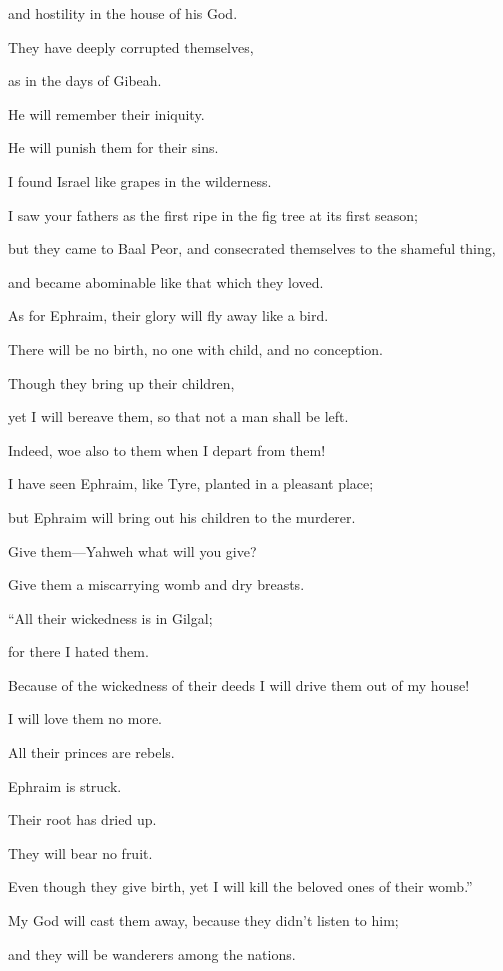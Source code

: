 {\par }{\QB and hostility in the house of his God.
\par }{\Q {}They have deeply corrupted themselves,
\par }{\QB as in the days of Gibeah.
\par }{\QB He will remember their iniquity.
\par }{\QB He will punish them for their sins.
\par }{\Q {}I found Israel like grapes in the wilderness.
\par }{\QB I saw your fathers as the first ripe in the fig tree at its first season;
\par }{\QB but they came to Baal Peor, and consecrated themselves to the shameful thing,
\par }{\QB and became abominable like that which they loved.
\par }{\Q {}As for Ephraim, their glory will fly away like a bird.
\par }{\QB There will be no birth, no one with child, and no conception.
\par }{\Q {}Though they bring up their children,
\par }{\QB yet I will bereave them, so that not a man shall be left.
\par }{\QB Indeed, woe also to them when I depart from them!
\par }{\Q {}I have seen Ephraim, like Tyre, planted in a pleasant place;
\par }{\QB but Ephraim will bring out his children to the murderer.
\par }{\Q {}Give them—Yahweh what will you give?
\par }{\QB Give them a miscarrying womb and dry breasts.
\par }{\BB \par }{\Q {}“All their wickedness is in Gilgal;
\par }{\QB for there I hated them.
\par }{\QB Because of the wickedness of their deeds I will drive them out of my house!
\par }{\QB I will love them no more.
\par }{\QB All their princes are rebels.
\par }{\Q {}Ephraim is struck.
\par }{\QB Their root has dried up.
\par }{\QB They will bear no fruit.
\par }{\QB Even though they give birth, yet I will kill the beloved ones of their womb.”
\par }{\BB \par }{\Q {}My God will cast them away, because they didn’t listen to him;
\par }{\QB and they will be wanderers among the nations.

}
